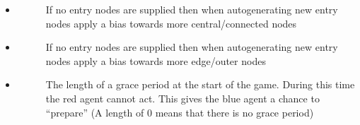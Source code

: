 \documentclass[letterpaper,10pt,english]{sphinxmanual}
\begin{document}
\begin{itemize}
\begin{description}
\end{description}

\item {} \begin{description}
\item[{}] \leavevmode
\sphinxAtStartPar
If no entry nodes are supplied then when auto\sphinxhyphen{}generating new entry nodes apply a bias towards more central/connected nodes

\end{description}

\item {} \begin{description}
\item[{}] \leavevmode
\sphinxAtStartPar
If no entry nodes are supplied then when auto\sphinxhyphen{}generating new entry nodes apply a bias towards more edge/outer nodes

\end{description}

\item {} \begin{description}
\item[{}] \leavevmode
\sphinxAtStartPar
The length of a grace period at the start of the game. During this time the red agent cannot act. This gives the blue agent a chance to “prepare” (A length of 0 means that there is no grace period)

\end{description}

\end{itemize}
\end{document}
